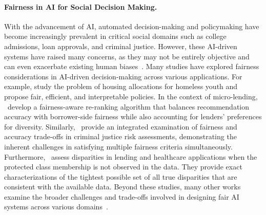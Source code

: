 \paragraph{Fairness in AI for Social Decision Making.} With the advancement of AI, automated decision-making and policymaking have become increasingly prevalent in critical social domains such as college admissions, loan approvals, and criminal justice. However, these AI-driven systems have raised many concerns, as they may not be entirely objective and can even exacerbate existing human biases~\citep{dastin2022amazon,angwin2022machine,samorani2022overbooked}. 
Many studies have explored fairness considerations in AI-driven decision-making across various applications. For example, \cite{azizi2018designing} study the problem of housing allocations for homeless youth and propose fair, efficient, and interpretable policies. In the context of micro-lending, \cite{liu2019personalized}~develop a fairness-aware re-ranking algorithm that balances recommendation accuracy with borrower-side fairness while also accounting for lenders’ preferences for diversity. Similarly, \cite{berk2021fairness}~provide an integrated examination of fairness and accuracy trade-offs in criminal justice risk assessments, demonstrating the inherent challenges in satisfying multiple fairness criteria simultaneously. Furthermore, \cite{kallus2022assessing}~assess disparities in lending and healthcare applications when the protected class membership is not observed in the data. They provide exact characterizations of the tightest possible set of all true disparities that are consistent with the available data. Beyond these studies, many other works examine the broader challenges and trade-offs involved in designing fair AI systems across various domains~\citep{mouzannar2019fair,corbett2023measure, kleinberg2017inherent,dai2025balancing,aghaei2019learning,raghavan2020mitigating,chen2023algorithmic,jia2024learning,wang2024wasserstein,liu2018delayed, baker2022algorithmic,taskesen2020distributionally,bertsimas2013fairness,nguyen2021scarce,corbett2017algorithmic,rahmattalabi2022learning,mashiat2022trade,rahmattalabi2021fair,freeman2020best,athanassoglou2011house}. 

